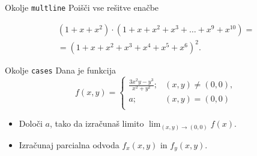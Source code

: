 \begin{frame}{Okolje \texttt{multline}}
	Poišči vse rešitve enačbe
	
	
	\begin{multline*}
		(1+x+x^2) \cdot (1+x+x^2+x^3+\ldots+x^9+x^{10}) =\\
		=(1+x+x^2+x^3+x^4+x^5+x^6)^2.
	\end{multline*}
	
	
\end{frame}

\begin{frame}{Okolje \texttt{cases}}
	Dana je funkcija
	\[
		f(x,y)=
		\begin{cases}
			\frac{3x^2y-y^3}{x^2+y^2};& (x,y)\neq (0,0),\\
			a;& (x,y)=(0,0)\\
		\end{cases}
	\]
	\begin{itemize}
	\item Določi $a$, tako da izračunaš limito \( \lim_{(x,y)\to(0,0)} f(x). \)
	\item Izračunaj parcialna odvoda $f_x(x,y)$ in $f_y(x,y)$.
	\end{itemize}
\end{frame}
